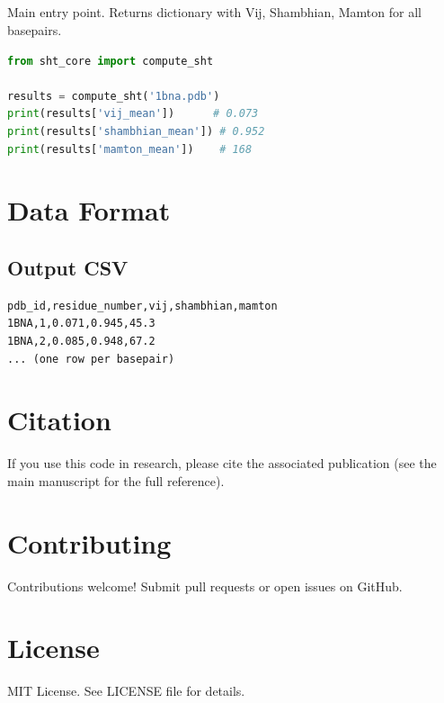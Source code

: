 \subsection{\texorpdfstring{}{compute\_sht(pdb\_file)}}

Main entry point. Returns dictionary with Vij, Shambhian, Mamton for all basepairs.

\begin{lstlisting}[language=Python]
from sht_core import compute_sht

results = compute_sht('1bna.pdb')
print(results['vij_mean'])      # 0.073
print(results['shambhian_mean']) # 0.952
print(results['mamton_mean'])    # 168
\end{lstlisting}

\section{Data Format}

\subsection{Output CSV}

\begin{verbatim}
pdb_id,residue_number,vij,shambhian,mamton
1BNA,1,0.071,0.945,45.3
1BNA,2,0.085,0.948,67.2
... (one row per basepair)
\end{verbatim}

\section{Citation}

If you use this code in research, please cite the associated publication
(see the main manuscript for the full reference).

\section{Contributing}

Contributions welcome! Submit pull requests or open issues on GitHub.

\section{License}

MIT License. See LICENSE file for details.
